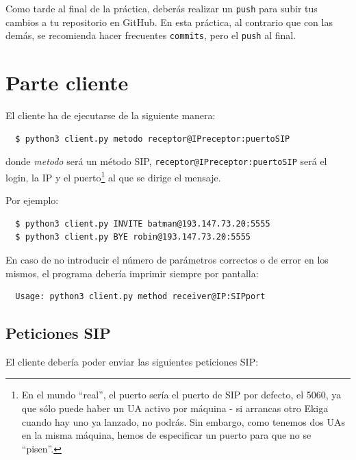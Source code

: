 \documentclass[a4paper,11pt]{article}
\begin{document}
 Como tarde al final de la práctica, deberás realizar un \texttt{push} para subir tus cambios a tu repositorio en GitHub. En esta práctica, al contrario que con las demás, se recomienda hacer frecuentes \texttt{commits}, pero el \texttt{push} al final.


\section*{Parte cliente}

El cliente ha de ejecutarse de la siguiente manera:
\begin{verbatim}
  $ python3 client.py metodo receptor@IPreceptor:puertoSIP
\end{verbatim}

donde \emph{metodo} será un método SIP, \texttt{receptor@IPreceptor:puertoSIP}
será el login, la IP y el puerto\footnote{En el mundo ``real'', el puerto sería 
el puerto de SIP por defecto, el 5060, ya que sólo puede haber un UA activo
por máquina - si arrancas otro Ekiga cuando hay uno ya lanzado, no podrás.
Sin embargo, como tenemos dos UAs en la
misma máquina, hemos de especificar un puerto para que no se ``pisen''.}
al que se dirige el mensaje.

Por ejemplo:
\begin{verbatim}
  $ python3 client.py INVITE batman@193.147.73.20:5555
  $ python3 client.py BYE robin@193.147.73.20:5555
\end{verbatim}

En caso de no introducir el número de parámetros correctos o de error en los mismos, el programa debería imprimir siempre por pantalla:

\begin{verbatim}
  Usage: python3 client.py method receiver@IP:SIPport
\end{verbatim}

\subsection*{Peticiones SIP}

El cliente debería poder enviar las siguientes peticiones SIP:
\end{document}
